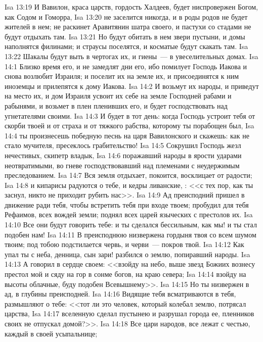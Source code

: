 \vs Isa 13:19 И Вавилон, краса царств, гордость Халдеев, будет ниспровержен Богом, как Содом и Гоморра,
\vs Isa 13:20 не заселится никогда, и в роды родов не будет жителей в нем; не раскинет Аравитянин шатра своего, и пастухи со стадами не будут отдыхать там.
\vs Isa 13:21 Но будут обитать в нем звери пустыни, и домы наполнятся филинами; и страусы поселятся, и косматые будут скакать там.
\vs Isa 13:22 Шакалы будут выть в чертогах их, и гиены~--- в увеселительных домах.
\vs Isa 14:1 Близко время его, и не замедлят дни его, ибо помилует Господь Иакова и снова возлюбит Израиля; и поселит их на земле их, и присоединятся к ним иноземцы и прилепятся к дому Иакова.
\vs Isa 14:2 И возьмут их народы, и приведут на место их, и дом Израиля усвоит их себе на земле Господней рабами и рабынями, и возьмет в плен пленивших его, и будет господствовать над угнетателями своими.
\rsbpar\vs Isa 14:3 И будет в тот день: когда Господь устроит тебя от скорби твоей и от страха и от тяжкого рабства, которому ты порабощен был,
\vs Isa 14:4 ты произнесешь победную песнь на царя Вавилонского и скажешь: как не стало мучителя, пресеклось грабительство!
\vs Isa 14:5 Сокрушил Господь жезл нечестивых, скипетр владык,
\vs Isa 14:6 поражавший народы в ярости ударами неотвратимыми, во гневе господствовавший над племенами с неудержимым преследованием.
\vs Isa 14:7 Вся земля отдыхает, покоится, восклицает от радости;
\vs Isa 14:8 и кипарисы радуются о тебе, и кедры ливанские, : <<с тех пор, как ты заснул, никто не приходит рубить нас>>.
\vs Isa 14:9 Ад преисподний пришел в движение ради тебя, чтобы встретить тебя при входе твоем; пробудил для тебя Рефаимов, всех вождей земли; поднял всех царей языческих с престолов их.
\vs Isa 14:10 Все они будут говорить тебе: и ты сделался бессильным, как мы! и ты стал подобен нам!
\vs Isa 14:11 В преисподнюю низвержена гордыня твоя со всем шумом твоим; под тобою подстилается червь, и черви~--- покров твой.
\vs Isa 14:12 Как упал ты с неба, денница, сын зари! разбился о землю, попиравший народы.
\vs Isa 14:13 А говорил в сердце своем: <<взойду на небо, выше звезд Божиих вознесу престол мой и сяду на гор в сонме богов, на краю севера;
\vs Isa 14:14 взойду на высоты облачные, буду подобен Всевышнему>>.
\vs Isa 14:15 Но ты низвержен в ад, в глубины преисподней.
\vs Isa 14:16 Видящие тебя всматриваются в тебя, размышляют о тебе: <<тот ли это человек, который колебал землю, потрясал царства,
\vs Isa 14:17 вселенную сделал пустынею и разрушал города ее, пленников своих не отпускал домой?>>.
\vs Isa 14:18 Все цари народов, все лежат с честью, каждый в своей усыпальнице;
